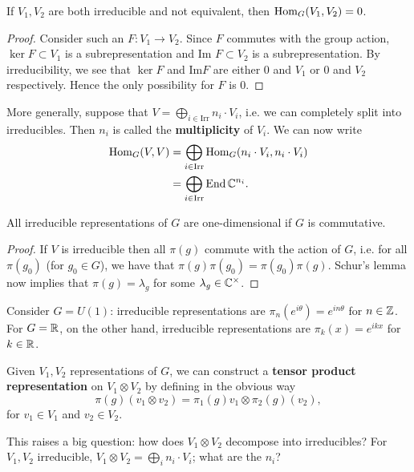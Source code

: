 \documentclass{../mathnotes}
\begin{document}
\begin{lem}
    If $V_1,V_2$ are both irreducible and not equivalent, then $\operatorname{Hom}_G(V_1,V_2)=0$.
\end{lem}
\begin{proof}
    Consider such an $F:V_1\to V_2$. Since $F$ commutes with the group action, $\ker F\subset V_1$ is a subrepresentation
    and $\text{Im } F\subset V_2$ is a subrepresentation. By irreducibility, we see that $\ker F$ and $\text{Im} F$ are
    either $0$ and $V_1$ or $0$ and $V_2$ respectively. Hence the only possibility for $F$ is 0.
\end{proof}

More generally, suppose that $V=\bigoplus_{i\in\text{Irr}}n_i\cdot V_i$, i.e. we can completely split into irreducibles.
Then $n_i$ is called the \textbf{multiplicity} of $V_i$.  We can now write
\begin{align*}
    \operatorname{Hom}_G(V,V)&=\bigoplus_{i\in\text{Irr}}\operatorname{Hom}_G(n_i\cdot V_i,n_i\cdot V_i)\\
    &=\bigoplus_{i\in\text{Irr}}\operatorname{End}\mathbb{C}^{n_i}.
\end{align*}

\begin{cor}
    All irreducible representations of $G$ are one-dimensional if $G$ is commutative.
\end{cor}
\begin{proof}
    If $V$ is irreducible then all $\pi(g)$ commute with the action of $G$, i.e. for all $\pi(g_0)$ (for $g_0\in G$),
    we have that $\pi(g)\pi(g_0)=\pi(g_0)\pi(g)$. Schur's lemma now implies that $\pi(g)=\lambda_g$ for some $\lambda_g\in\mathbb{C}^\times$.
\end{proof}

\begin{exmp}
    Consider $G=U(1)$: irreducible representations are $\pi_n(e^{i\theta})=e^{in\theta}$ for $n\in\mathbb{Z}$.
    For $G=\mathbb{R}$, on the other hand, irreducible representations are $\pi_k(x)=e^{ikx}$ for $k\in\mathbb{R}$.
\end{exmp}

\begin{defn}
    Given $V_1,V_2$ representations of $G$, we can construct a \textbf{tensor product representation} on $V_1\otimes V_2$ by defining in the obvious way
    \[\pi(g)(v_1\otimes v_2)=\pi_{1}(g)v_1\otimes \pi_2(g)(v_2),\]
    for $v_1\in V_1$ and $v_2\in V_2$.
\end{defn}

This raises a big question: how does $V_1\otimes V_2$ decompose into irreducibles? For $V_1,V_2$ irreducible, $V_1\otimes V_2=\bigoplus_i n_i\cdot V_i$; what are the $n_i$?
\end{document}
